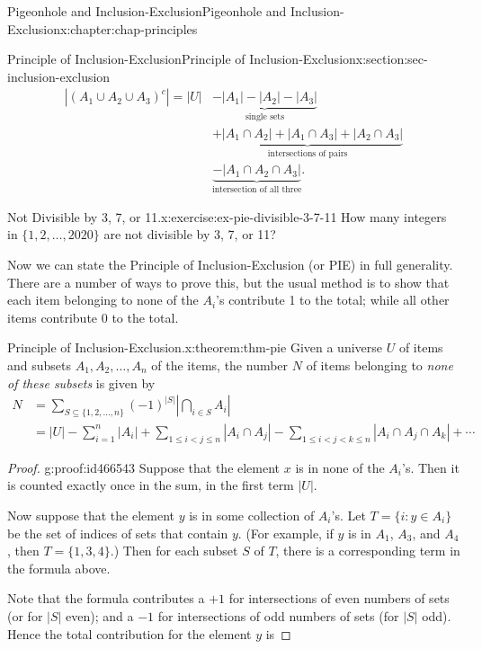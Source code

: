 \documentclass[oneside,10pt,]{book}
\numberwithin{equation}{section}
\newcommand{\lt}{<}
\newcommand{\amp}{&}
\begin{document}
\begin{chapterptx}{Pigeonhole and Inclusion-Exclusion}{}{Pigeonhole and Inclusion-Exclusion}{}{}{x:chapter:chap-principles}
\begin{sectionptx}{Principle of Inclusion-Exclusion}{}{Principle of Inclusion-Exclusion}{}{}{x:section:sec-inclusion-exclusion}
\begin{align*}
|(A_1 \cup A_2 \cup A_3)^c| = |U| \amp \underbrace{- |A_1| - |A_2| - |A_3|}_{\text{single sets}} \\
\amp \underbrace{+ |A_1 \cap A_2| + |A_1 \cap A_3| + |A_2 \cap A_3|}_{\text{intersections of pairs}}\\
\amp \underbrace{- |A_1 \cap A_2 \cap A_3|}_{\text{intersection of all three}}\text{.}
\end{align*}
%
\begin{inlineexercise}{Not Divisible by 3, 7, or 11.}{x:exercise:ex-pie-divisible-3-7-11}%
How many integers in \(\{1,2,\ldots,2020\}\) are not divisible by 3, 7, or 11?%
\end{inlineexercise}
Now we can state the Principle of Inclusion-Exclusion (or PIE) in full generality. There are a number of ways to prove this, but the usual method is to show that each item belonging to none of the \(A_i\)'s contribute 1 to the total; while all other items contribute 0 to the total.%
\begin{theorem}{Principle of Inclusion-Exclusion.}{}{x:theorem:thm-pie}%
Given a universe \(U\) of items and subsets \(A_1,A_2,\ldots,A_n\) of the items, the number \(N\) of items belonging to \emph{none of these subsets} is given by%
\begin{align*}
N \amp = \sum_{S \subseteq \{1,2,\ldots,n\}} (-1)^{|S|} \left| \bigcap_{i\in S} A_i\right|\\
\amp  = |U| - \sum_{i = 1}^n |A_i| + \sum_{1 \leq i \lt j \leq n} |A_i \cap A_j| - \sum_{1 \leq i \lt j \lt k \leq n} |A_i \cap A_j \cap A_k| + \cdots 
\end{align*}
%
\end{theorem}
\begin{proof}{}{g:proof:id466543}
Suppose that the element \(x\) is in none of the \(A_i\)'s. Then it is counted exactly once in the sum, in the first term \(|U|\).%
\par
Now suppose that the element \(y\) is in some collection of \(A_i\)'s. Let \(T = \{i : y \in A_i\}\) be the set of indices of sets that contain \(y\). (For example, if \(y\) is in \(A_1\), \(A_3\), and \(A_4\), then \(T = \{1,3,4\}\).) Then for each subset \(S\) of \(T\), there is a corresponding term in the formula above.%
\par
Note that the formula contributes a \(+1\) for intersections of even numbers of sets (or for \(|S|\) even); and a \(-1\) for intersections of odd numbers of sets (for \(|S|\) odd). Hence the total contribution for the element \(y\) is%

\end{proof}
\end{sectionptx}
\end{chapterptx}
\end{document}
